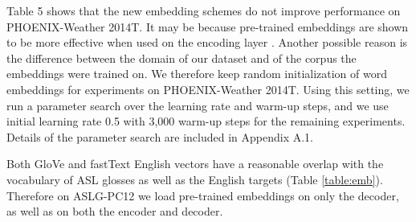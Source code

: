 \documentclass[11pt]{article}
\begin{document}
\begin{center}
\label{table:deemb}
\end{center}


Table 5 shows that the new embedding schemes do not improve performance on PHOENIX-Weather 2014T. It may be because pre-trained embeddings are shown to be more effective when used on the encoding layer \cite{pretrain}. Another possible reason is the difference between the domain of our dataset and of the corpus the embeddings were trained on. We therefore keep random initialization of word embeddings for experiments on PHOENIX-Weather 2014T. Using this setting, we run a parameter search over the learning rate and warm-up steps, and we use initial learning rate 0.5 with 3,000 warm-up steps for the remaining experiments. Details of the parameter search are included in Appendix A.1.

Both GloVe and fastText English vectors have a reasonable overlap with the vocabulary of ASL glosses as well as the English targets (Table \ref{table:emb}). Therefore on ASLG-PC12 we load pre-trained embeddings on only the decoder, as well as on both the encoder and decoder.
\end{document}
